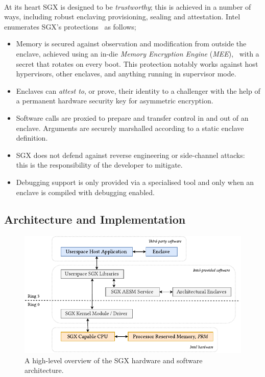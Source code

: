 \paragraph{} At its heart SGX is designed to be \textit{trustworthy}; this is achieved in a number of ways, including robust enclaving provisioning, sealing and attestation. Intel enumerates SGX's protections~\cite{10.1145/2487726.2488368,sgx-eval-sdk} as follows;

\begin{itemize}
    \item Memory is secured against observation and modification from outside the enclave, achieved using an in-die \textit{Memory Encryption Engine} (\textit{MEE}),~\cite{sgx-mee} with a secret that rotates on every boot. This protection notably works against host hypervisors, other enclaves, and anything running in supervisor mode.
    \item Enclaves can \textit{attest to}, or prove, their identity to a challenger with the help of a permanent hardware security key for asymmetric encryption.
    \item Software calls are proxied to prepare and transfer control in and out of an enclave. Arguments are securely marshalled according to a static enclave definition.
    \item SGX does not defend against reverse engineering or side-channel attacks:~\cite{10.1109/SP.2015.45} this is the responsibility of the developer to mitigate.
    \item Debugging support is only provided via a specialised tool and only when an enclave is compiled with debugging enabled.
\end{itemize}

\subsection{Architecture and Implementation}

\begin{figure}[]
    \centering
    \includegraphics[width=0.9\linewidth]{figures/SGX-AdvArchitecture.pdf}
    \caption{A high-level overview of the SGX hardware and software architecture.}
    \label{fig:sgx-advarch}
\end{figure}

